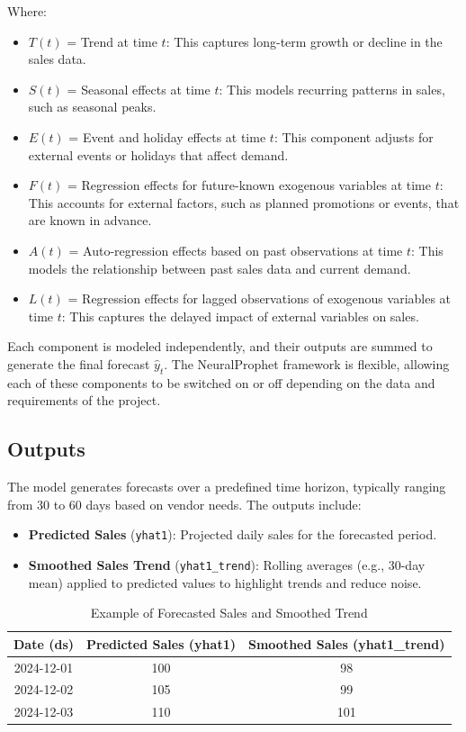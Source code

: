Where:
\begin{itemize}
  \item \( T(t) \) = Trend at time \( t \): This captures long-term growth or decline in the sales data.
  \item \( S(t) \) = Seasonal effects at time \( t \): This models recurring patterns in sales, such as seasonal peaks.
  \item \( E(t) \) = Event and holiday effects at time \( t \): This component adjusts for external events or holidays that affect demand.
  \item \( F(t) \) = Regression effects for future-known exogenous variables at time \( t \): This accounts for external factors, such as planned promotions or events, that are known in advance.
  \item \( A(t) \) = Auto-regression effects based on past observations at time \( t \): This models the relationship between past sales data and current demand.
  \item \( L(t) \) = Regression effects for lagged observations of exogenous variables at time \( t \): This captures the delayed impact of external variables on sales.
\end{itemize}

Each component is modeled independently, and their outputs are summed to generate the final forecast \( \hat{y}_t \). The NeuralProphet framework is flexible, allowing each of these components to be switched on or off depending on the data and requirements of the project.

\subsection{Outputs}

The model generates forecasts over a predefined time horizon, typically ranging from 30 to 60 days based on vendor needs. The outputs include:

\begin{itemize}
    \item \textbf{Predicted Sales} (\texttt{yhat1}): Projected daily sales for the forecasted period.
    \item \textbf{Smoothed Sales Trend} (\texttt{yhat1\_trend}): Rolling averages (e.g., 30-day mean) applied to predicted values to highlight trends and reduce noise.
\end{itemize}

\begin{table}[h!]
\centering
\begin{tabular}{|c|c|c|}
\hline
\textbf{Date (ds)} & \textbf{Predicted Sales (yhat1)} & \textbf{Smoothed Sales (yhat1\_trend)} \\
\hline
2024-12-01 & 100 & 98 \\
2024-12-02 & 105 & 99 \\
2024-12-03 & 110 & 101 \\
\hline
\end{tabular}
\caption{Example of Forecasted Sales and Smoothed Trend}
\end{table}

